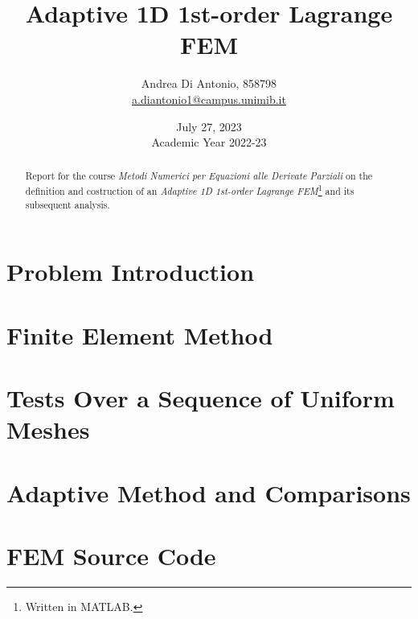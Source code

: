 \documentclass[12pt]{article}
\title{Adaptive 1D 1st-order Lagrange FEM}
\author{Andrea Di Antonio, 858798 \\ \hyperlink{mailto:a.diantonio1@campus.unimib.it}{a.diantonio1@campus.unimib.it}}
\date{July 27, 2023 \\ Academic Year 2022-23}
\begin{document}
	\maketitle
	\thispagestyle{fancy}

	\begin{abstract}
		\begin{center}
            Report for the course \textit{Metodi Numerici per Equazioni alle Derivate Parziali} on the definition and costruction of an \textit{Adaptive 1D 1st-order Lagrange FEM}\footnote{Written in MATLAB.} and its subsequent analysis.
        \end{center}
	\end{abstract}

    \newpage
    \tableofcontents

    \newpage
    \section{Problem Introduction}
    

    \newpage
    \section{Finite Element Method}
    

    \newpage
    \section{Tests Over a Sequence of Uniform Meshes}

    \newpage
    \section{Adaptive Method and Comparisons}

    \newpage
    \section{FEM Source Code}
    
\end{document}
